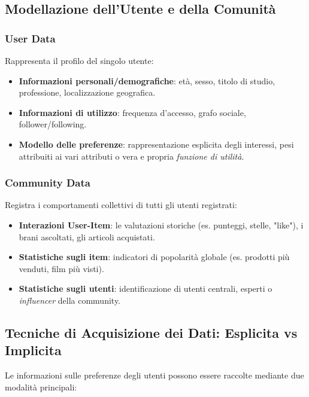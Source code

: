 \subsection{Modellazione dell'Utente e della Comunità}

\subsubsection{User Data}
Rappresenta il profilo del singolo utente:
\begin{itemize}
    \item \textbf{Informazioni personali/demografiche}: età, sesso, titolo di studio, professione, localizzazione geografica.
    \item \textbf{Informazioni di utilizzo}: frequenza d'accesso, grafo sociale, follower/following.
    \item \textbf{Modello delle preferenze}: rappresentazione esplicita degli interessi, pesi attribuiti ai vari attributi o vera e propria \textit{funzione di utilità}.
\end{itemize}

\subsubsection{Community Data}
Registra i comportamenti collettivi di tutti gli utenti registrati:
\begin{itemize}
    \item \textbf{Interazioni User-Item}: le valutazioni storiche (es. punteggi, stelle, "like"), i brani ascoltati, gli articoli acquistati.
    \item \textbf{Statistiche sugli item}: indicatori di popolarità globale (es. prodotti più venduti, film più visti).
    \item \textbf{Statistiche sugli utenti}: identificazione di utenti centrali, esperti o \textit{influencer} della community.
\end{itemize}



\subsection{Tecniche di Acquisizione dei Dati: Esplicita vs Implicita}
Le informazioni sulle preferenze degli utenti possono essere raccolte mediante due modalità principali:

